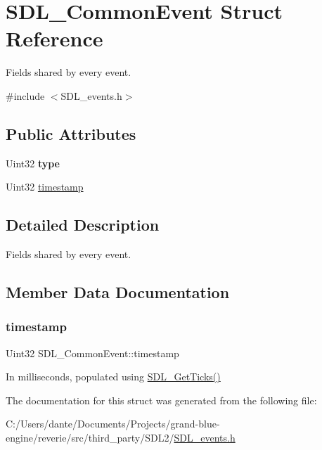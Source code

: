 \hypertarget{struct_s_d_l___common_event}{}\section{S\+D\+L\+\_\+\+Common\+Event Struct Reference}
\label{struct_s_d_l___common_event}


Fields shared by every event.  




{\ttfamily \#include $<$S\+D\+L\+\_\+events.\+h$>$}

\subsection*{Public Attributes}
\begin{DoxyCompactItemize}
\item 
\mbox{\label{struct_s_d_l___common_event_a4ecd888325355321b42b2e2956f27453}} 
Uint32 {\bfseries type}
\item 
Uint32 \mbox{\hyperlink{struct_s_d_l___common_event_a7d9046abb021ffc88dd5d32978289e65}{timestamp}}
\end{DoxyCompactItemize}


\subsection{Detailed Description}
Fields shared by every event. 

\subsection{Member Data Documentation}
\mbox{\label{struct_s_d_l___common_event_a7d9046abb021ffc88dd5d32978289e65}} 
\subsubsection{\texorpdfstring{timestamp}{timestamp}}
{\footnotesize\ttfamily Uint32 S\+D\+L\+\_\+\+Common\+Event\+::timestamp}

In milliseconds, populated using \mbox{\hyperlink{_s_d_l__timer_8h_a0b9bc71d6287e0ffafdc3419760fe2b3}{S\+D\+L\+\_\+\+Get\+Ticks()}} 

The documentation for this struct was generated from the following file\+:\begin{DoxyCompactItemize}
\item 
C\+:/\+Users/dante/\+Documents/\+Projects/grand-\/blue-\/engine/reverie/src/third\+\_\+party/\+S\+D\+L2/\mbox{\hyperlink{_s_d_l__events_8h}{S\+D\+L\+\_\+events.\+h}}\end{DoxyCompactItemize}
